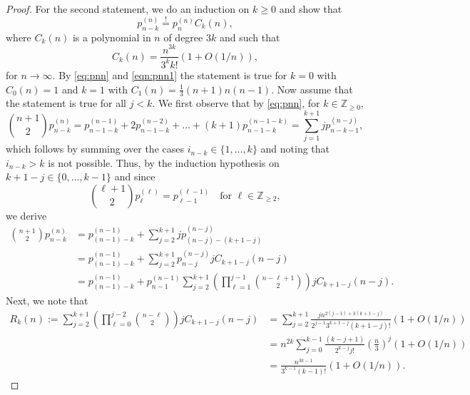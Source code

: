\documentclass[11pt,a4paper]{article}
\numberwithin{equation}{section}
\def\ZZ{\mathbb{Z}}
\begin{document}
\begin{proof}
    \medskip
    For the second statement, we do an induction on $k\geq 0$ and show that
    \begin{equation*}
        p_{n-k}^{(n)} \overset{!}{=} p_n^{(n)} C_k(n),
    \end{equation*}
    where $C_k(n)$ is a polynomial in $n$ of degree $3k$ and such that
    \begin{equation*}
        C_k(n) = \frac{n^{3k}}{3^k k!} (1+O(1/n)),
    \end{equation*}
    for $n\to \infty$.
    By \eqref{eq:pnn} and \eqref{eqn:pnn1} the statement is true for $k=0$ with $C_0(n)=1$ and $k=1$ with $C_1(n) = \frac{1}{3}(n+1)n(n-1)$.
    Now assume that the statement is true for all $j<k$.
    We first observe that by \eqref{eq:pnn}, for $k\in \ZZ_{\geq 0}$,
    \begin{equation*}
        \binom{n+1}{2} p_{n-k}^{(n)} = p_{n-1-k}^{(n-1)} + 2 p_{n-1-k}^{(n-2)} + \ldots + (k+1) p_{n-1-k}^{(n-1-k)} = \sum_{j=1}^{k+1} j p_{n-k-1}^{(n-j)},
    \end{equation*}
    which follows by summing over the cases $i_{n-k}\in \{1,\dotsc,k\}$ and noting that $i_{n-k}>k$ is not possible.
    Thus, by the induction hypothesis on $k+1-j\in\{0,\dotsc,k-1\}$ and since
    \begin{equation*}
        \binom{\ell+1}{2} p_\ell^{(\ell)} = p_{\ell-1}^{(\ell-1)} \quad \text{for $\ell\in\ZZ_{\geq 2}$},
    \end{equation*}
    we derive
    \begin{align*}
        \binom{n+1}{2} p_{n-k}^{(n)}
        &= p_{(n-1)-k}^{(n-1)} + \sum_{j=2}^{k+1} j p_{(n-j)-(k+1-j)}^{(n-j)}\\
        &= p_{(n-1)-k}^{(n-1)} + \sum_{j=2}^{k+1} p_{n-j}^{(n-j)} j C_{k+1-j}(n-j)\\
        &= p_{(n-1)-k}^{(n-1)} + p_{n-1}^{(n-1)} \sum_{j=2}^{k+1} \left(\prod_{\ell=1}^{j-1} \binom{n-\ell+1}{2}\right) j C_{k+1-j}(n-j).
    \end{align*}
    Next, we note that
    \begin{align*}
        R_k(n):= \sum_{j=2}^{k+1} \left(\prod_{\ell=0}^{j-2} \binom{n-\ell}{2}\right) j C_{k+1-j}(n-j) 
        &= \sum_{j=2}^{k+1} \frac{j n^{2(j-1) + 3(k+1-j)}}{2^{j-1} 3^{k+1-j} (k+1-j)!} (1+O(1/n))\\
        &= n^{2k} \sum_{j=0}^{k-1} \frac{(k-j+1)}{2^{k-j}j!} \left(\frac{n}{3}\right)^{j} (1+O(1/n))\\
        &= \frac{n^{3k-1}}{3^{k-1} (k-1)!} (1+O(1/n)).
    \end{align*}

\end{proof}
\end{document}

